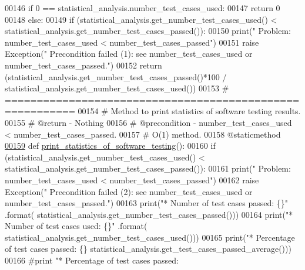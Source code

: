 \begin{DoxyCode}
00146         \textcolor{keywordflow}{if} 0 == statistical\_analysis.number\_test\_cases\_used:
00147             \textcolor{keywordflow}{return} 0
00148         \textcolor{keywordflow}{else}:
00149             \textcolor{keywordflow}{if} (statistical\_analysis.get\_number\_test\_cases\_used() < 
      statistical\_analysis.get\_number\_test\_cases\_passed()):
00150                 print(\textcolor{stringliteral}{" Problem: number\_test\_cases\_used < number\_test\_cases\_passed"})
00151                 \textcolor{keywordflow}{raise} Exception(\textcolor{stringliteral}{"   Precondition failed (1): see number\_test\_cases\_used or
       number\_test\_cases\_passed."})
00152             \textcolor{keywordflow}{return} (statistical\_analysis.get\_number\_test\_cases\_passed()*100 / 
      statistical\_analysis.get\_number\_test\_cases\_used())
00153     \textcolor{comment}{# =========================================================}
00154     \textcolor{comment}{#   Method to print statistics of software testing results.}
00155     \textcolor{comment}{#   @return - Nothing}
00156     \textcolor{comment}{#   @precondition - number\_test\_cases\_used < number\_test\_cases\_passed.}
00157     \textcolor{comment}{#   O(1) method.}
00158     @staticmethod
\hypertarget{test__statistics_8py_source_l00159}{}\hyperlink{classstatistics_1_1test__statistics_1_1statistical__analysis_ad6bdf2cde8553974d93d5971870970d8}{00159}     \textcolor{keyword}{def }\hyperlink{classstatistics_1_1test__statistics_1_1statistical__analysis_ad6bdf2cde8553974d93d5971870970d8}{print\_statistics\_of\_software\_testing}():
00160         \textcolor{keywordflow}{if} (statistical\_analysis.get\_number\_test\_cases\_used() < 
      statistical\_analysis.get\_number\_test\_cases\_passed()):
00161             print(\textcolor{stringliteral}{" Problem: number\_test\_cases\_used < number\_test\_cases\_passed"})
00162             \textcolor{keywordflow}{raise} Exception(\textcolor{stringliteral}{"   Precondition failed (2): see number\_test\_cases\_used or
       number\_test\_cases\_passed."})
00163         print(\textcolor{stringliteral}{"*    Number of test cases passed:        \{\}"} .format(
      statistical\_analysis.get\_number\_test\_cases\_passed()))
00164         print(\textcolor{stringliteral}{"*    Number of test cases used:      \{\}"} .format(
      statistical\_analysis.get\_number\_test\_cases\_used()))
00165         print(\textcolor{stringliteral}{"*    Percentage of test cases passed:    \{\}%
      statistical\_analysis.get\_test\_cases\_passed\_average()))
00166         \textcolor{comment}{#print "*   Percentage of test cases passed:    
}}
\end{DoxyCode}
